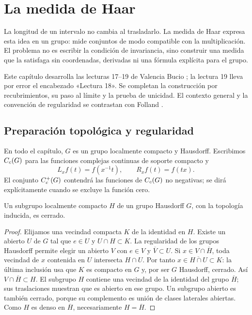 \chapter{La medida de Haar}\label{v4:haar}\label{cap:v4-10}
La longitud de un intervalo no cambia al trasladarlo. La medida de Haar expresa esta idea en un grupo: mide conjuntos de modo compatible con la multiplicación. El problema no es escribir la condición de invariancia, sino construir una medida que la satisfaga sin coordenadas, derivadas ni una fórmula explícita para el grupo.

Este capítulo desarrolla las lecturas 17--19 de Valencia Bucio \cite{valencia4}; la lectura 19 lleva por error el encabezado «Lectura 18». Se completan la construcción por recubrimientos, su paso al límite y la prueba de unicidad. El contexto general y la convención de regularidad se contrastan con Folland \cite{folland2016}.

\section{Preparación topológica y regularidad}\label{lectura:v4-17}
En todo el capítulo, $G$ es un grupo localmente compacto y Hausdorff. Escribimos $C_c(G)$ para las funciones complejas continuas de soporte compacto y
\[
 L_xf(t)=f(x^{-1}t),\qquad R_xf(t)=f(tx).
\]
El conjunto $C_c^+(G)$ contendrá las funciones de $C_c(G)$ no negativas; se dirá explícitamente cuando se excluye la función cero.

\begin{proposicion}\label{v4:haar-subgrupo}
Un subgrupo localmente compacto $H$ de un grupo Hausdorff $G$, con la topología inducida, es cerrado.
\end{proposicion}
\begin{proof}
Elijamos una vecindad compacta $K$ de la identidad en $H$. Existe un abierto $U$ de $G$ tal que $e\in U$ y $U\cap H\subset K$. La regularidad de los grupos Hausdorff permite elegir un abierto $V$ con $e\in V$ y $\overline V\subset U$. Si $x\in V\cap\overline H$, toda vecindad de $x$ contenida en $U$ intersecta $H\cap U$. Por tanto $x\in\overline{H\cap U}\subset K$: la última inclusión usa que $K$ es compacto en $G$ y, por ser $G$ Hausdorff, cerrado. Así $V\cap\overline H\subset H$. El subgrupo $H$ contiene una vecindad de la identidad del grupo $\overline H$; sus traslaciones muestran que es abierto en ese grupo. Un subgrupo abierto es también cerrado, porque su complemento es unión de clases laterales abiertas. Como $H$ es denso en $\overline H$, necesariamente $H=\overline H$.
\end{proof}

